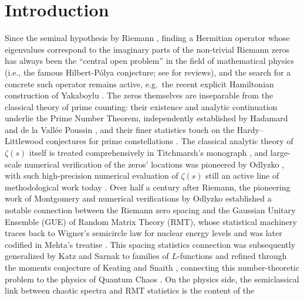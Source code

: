 \documentclass[mca,article,submit,oneauthor,pdftex]{Definitions/mdpi}
\begin{document}
\maketitle

\section{Introduction}

Since the seminal hypothesis by Riemann \cite{riemann1859}, finding a Hermitian
operator whose eigenvalues correspond to the imaginary parts of
the non-trivial Riemann zeros has always been the ``central open problem'' in the
field of mathematical physics (i.e., the famous Hilbert-P\'olya
conjecture; see \cite{katzsarnak1999,schumayer2011,conrey2003} for reviews),
and the search for a concrete such operator remains active, e.g.\ the
recent explicit Hamiltonian construction of Yakaboylu \cite{yakaboylu2024}.
The zeros themselves are inseparable from the classical theory of prime
counting: their existence and analytic continuation underlie the Prime
Number Theorem, independently established by Hadamard \cite{hadamard1896} and
de la Vall\'ee Poussin \cite{delavallee1896}, and their finer statistics touch
on the Hardy--Littlewood conjectures for prime constellations
\cite{hardylittlewood1923}. The classical analytic theory of \(\zeta(s)\)
itself is treated comprehensively in Titchmarsh's monograph
\cite{titchmarsh1951}, and large-scale numerical verification of the
zeros' locations was pioneered by Odlyzko \cite{odlyzko1989}, with such
high-precision numerical evaluation of $\zeta(s)$ still an active line of
methodological work today \cite{orellana2025}. Over half a
century after Riemann, the pioneering work of
Montgomery \cite{montgomery1973} and numerical verifications by Odlyzko \cite{odlyzko1987}
established a notable connection between the Riemann zero spacing and
the Gaussian Unitary Ensemble (GUE) of Random Matrix Theory (RMT), whose
statistical machinery traces back to Wigner's semicircle law for nuclear
energy levels \cite{wigner1955} and was later codified in Mehta's
treatise \cite{mehta2004}. This spacing statistics connection was
subsequently generalized by Katz and Sarnak to families of \(L\)-functions
\cite{katzsarnak1999,rudnicksarnak1996} and refined through the moments
conjecture of Keating and Snaith \cite{keatingsnaith2000}, connecting
this number-theoretic problem to the physics of Quantum Chaos
\cite{berry1986}. On the physics side, the semiclassical link between
chaotic spectra and RMT statistics is the content of the
\end{document}
